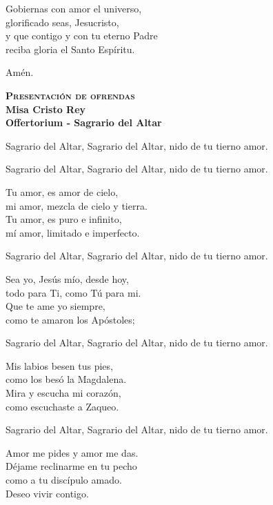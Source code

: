 \documentclass[letterpaper]{report}
\begin{document}
    Gobiernas con amor el universo,\\
    glorificado seas, Jesucristo,\\
    y que contigo y con tu eterno Padre\\
    reciba gloria el Santo Esp\'iritu.
  
    Am\'en.
    \clearpage
    
    \begin{center}
        {\scshape \Huge {\bfseries Presentaci\'on de ofrendas}} \\
        {\LARGE {\bfseries Misa Cristo Rey}} \\
        {\Large {\bfseries Offertorium - Sagrario del Altar}}
    \end{center}
    
    Sagrario del Altar, Sagrario del Altar, nido de tu tierno amor.
    
    Sagrario del Altar, Sagrario del Altar, nido de tu tierno amor.
    
    Tu amor, es amor de cielo,\\
    mi amor, mezcla de cielo y tierra.\\
    Tu amor, es puro e infinito,\\
    m\'i amor, limitado e imperfecto.
    
    Sagrario del Altar, Sagrario del Altar, nido de tu tierno amor.
    
    Sea yo, Jes\'us m\'io, desde hoy,\\
    todo para Ti, como T\'u para mi.\\
    Que te ame yo siempre,\\
    como te amaron los Ap\'ostoles;
  
    Sagrario del Altar, Sagrario del Altar, nido de tu tierno amor.

    Mis labios besen tus pies,\\
    como los bes\'o la Magdalena.\\
    Mira y escucha mi coraz\'on,\\
    como escuchaste a Zaqueo.

    Sagrario del Altar, Sagrario del Altar, nido de tu tierno amor.

    Amor me pides y amor me das.\\
    D\'ejame reclinarme en tu pecho\\
    como a tu disc\'ipulo amado.\\
    Deseo vivir contigo.
\end{document}
